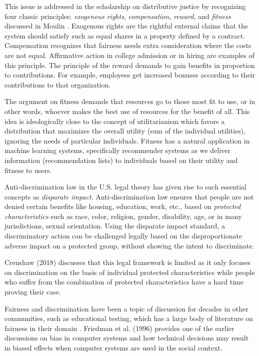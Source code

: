     This issue is addressed in the scholarship on distributive justice by recognizing four classic principles: \textit{exogenous rights}, \textit{compensation}, \textit{reward}, and  \textit{fitness} discussed in Moulin \cite{Moulin:FairDivision}. Exogenous rights are the rightful external claims that the system should satisfy such as equal shares in a property defined by a contract. Compensation recognizes that fairness needs extra consideration where the costs are not equal. Affirmative action in college admission or in hiring are examples of this principle. The principle of the reward demands to gain benefits in proportion to contributions. For example, employees get increased bonuses according to their contributions to that organization.
    
    The argument on fitness demands that resources go to those most fit to use, or in other words, whoever makes the best use of resources for the benefit of all. This idea is ideologically close to the concept of utilitarianism which favors a distribution that maximizes the overall utility (sum of the individual utilities), ignoring the needs of particular individuals. Fitness has a natural application in machine learning systems, specifically recommender systems as we deliver information (recommendation lists) to individuals based on their utility and fitness to users.
    
    Anti-discrimination law in the U.S. legal theory has given rise to such essential concepts as \textit{disparate impact}. Anti-discrimination law ensures that people are not denied certain benefits like housing, education, work, etc., based on \textit{protected characteristics} such as race, color, religion, gender, disability, age, or in many jurisdictions, sexual orientation. Using the disparate impact standard, a discriminatory action can be challenged legally based on the disproportionate adverse impact on a protected group, without showing the intent to discriminate.
    
    Crenshaw (2018) \cite{clark2018demarginalizing} discusses that this legal framework is limited as it only focuses on discrimination on the basis of individual protected characteristics while people who suffer from the combination of protected characteristics have a hard time proving their case.
    
    Fairness and discrimination have been a topic of discussion for decades in other communities, such as educational testing, which has a large body of literature on fairness in their domain \cite{Hutchinson2019history}. Friedman et al. (1996) \cite{Friedman1996Bias} provides one of the earlier discussions on bias in computer systems and how technical decisions may result in biased effects when computer systems are used in the social context. 
    
